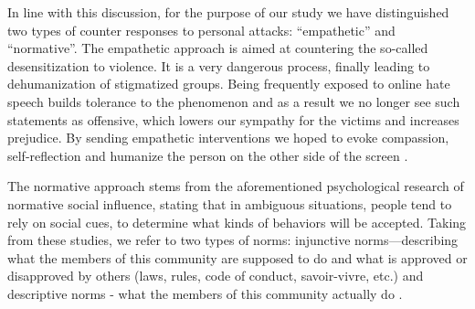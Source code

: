 \documentclass[preprint,12pt]{elsarticle}
\begin{document}
 
 
 In line with this discussion, for the purpose of our study we have distinguished two types of counter responses to personal attacks: ``empathetic'' and ``normative''. The empathetic approach is aimed at countering the so-called desensitization to violence. It is a very dangerous process, finally leading to dehumanization of stigmatized groups. %
 Being frequently exposed to online hate speech builds tolerance to the phenomenon and as a result we no longer see such statements as offensive, which lowers our sympathy for the victims and increases prejudice. By sending empathetic interventions we hoped to evoke compassion, self-reflection and humanize the person on the other side of the screen \citep{bilewicz2021artificial}. 

The normative approach stems from the  aforementioned psychological research of normative social influence, stating that in ambiguous situations, people tend to rely on social cues, to determine what kinds of behaviors will be accepted. Taking from these studies, we refer to two types of norms: injunctive norms---describing what the members of this community are supposed to do and what is approved or disapproved by others (laws, rules, code of conduct, savoir-vivre, etc.) and descriptive norms - what the members of this community actually do \citep{cialdini_focus_1991, cialdini2004social, cialdini2006managing}. 


\end{document}
